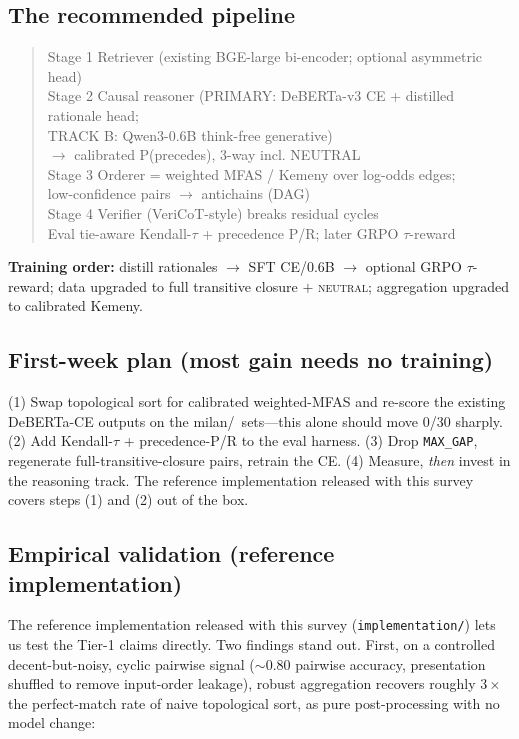 \subsection{The recommended pipeline}
\begin{quote}\small\ttfamily
Stage 1  Retriever (existing BGE-large bi-encoder; optional asymmetric head) \\
Stage 2  Causal reasoner (PRIMARY: DeBERTa-v3 CE + distilled rationale head; \\
\phantom{Stage 2  }TRACK B: Qwen3-0.6B think-free generative) \\
\phantom{Stage 2  }$\rightarrow$ calibrated P(precedes), 3-way incl. NEUTRAL \\
Stage 3  Orderer = weighted MFAS / Kemeny over log-odds edges; \\
\phantom{Stage 3  }low-confidence pairs $\rightarrow$ antichains (DAG) \\
Stage 4  Verifier (VeriCoT-style) breaks residual cycles \\
Eval     tie-aware Kendall-$\tau$ + precedence P/R; later GRPO $\tau$-reward
\end{quote}
\textbf{Training order:} distill rationales $\rightarrow$ SFT CE/0.6B $\rightarrow$ optional
GRPO $\tau$-reward; data upgraded to full transitive closure $+$ \textsc{neutral};
aggregation upgraded to calibrated Kemeny.

\subsection{First-week plan (most gain needs no training)}
(1) Swap topological sort for calibrated weighted-MFAS and re-score the existing DeBERTa-CE
outputs on the milan/\ajo\ sets---this alone should move 0/30 sharply. (2) Add Kendall-$\tau$
+ precedence-P/R to the eval harness. (3) Drop \texttt{MAX\_GAP}, regenerate
full-transitive-closure pairs, retrain the CE. (4) Measure, \emph{then} invest in the
reasoning track. The reference implementation released with this survey covers steps (1)
and (2) out of the box.

\subsection{Empirical validation (reference implementation)}
The reference implementation released with this survey (\texttt{implementation/}) lets us
test the Tier-1 claims directly. Two findings stand out. First, on a controlled
decent-but-noisy, cyclic pairwise signal ($\sim$0.80 pairwise accuracy, presentation
shuffled to remove input-order leakage), robust aggregation recovers roughly
$3\times$ the perfect-match rate of naive topological sort, as pure post-processing with no
model change:

